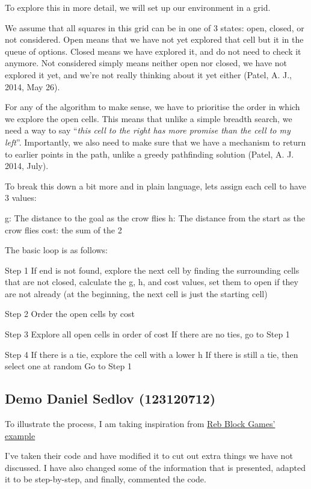 \documentclass[11pt]{article}
\begin{document}
    To explore this in more detail, we will set up our environment in a
grid.

We assume that all squares in this grid can be in one of 3 states: open,
closed, or not considered. Open means that we have not yet explored that
cell but it in the queue of options. Closed means we have explored it,
and do not need to check it anymore. Not considered simply means neither
open nor closed, we have not explored it yet, and we're not really
thinking about it yet either (Patel, A. J., 2014, May 26).

For any of the algorithm to make sense, we have to prioritise the order
in which we explore the open cells. This means that unlike a simple
breadth search, we need a way to say ``\emph{this cell to the right has
more promise than the cell to my left}''. Importantly, we also need to
make sure that we have a mechanism to return to earlier points in the
path, unlike a greedy pathfinding solution (Patel, A. J. 2014, July).

    To break this down a bit more and in plain language, lets assign each
cell to have 3 values:

g: The distance to the goal as the crow flies h: The distance from the
start as the crow flies cost: the sum of the 2

The basic loop is as follows:

Step 1 If end is not found, explore the next cell by finding the
surrounding cells that are not closed, calculate the g, h, and cost
values, set them to open if they are not already (at the beginning, the
next cell is just the starting cell)

Step 2 Order the open cells by cost

Step 3 Explore all open cells in order of cost If there are no ties, go
to Step 1

Step 4 If there is a tie, explore the cell with a lower h If there is
still a tie, then select one at random Go to Step 1

    \subsection{Demo Daniel Sedlov
(123120712)}\label{demo-daniel-sedlov-123120712}

To illustrate the process, I am taking inspiration from
\href{https://www.redblobgames.com/pathfinding/a-star/implementation.html}{Reb
Block Games' example}

I've taken their code and have modified it to cut out extra things we
have not discussed. I have also changed some of the information that is
presented, adapted it to be step-by-step, and finally, commented the
code.
\end{document}
